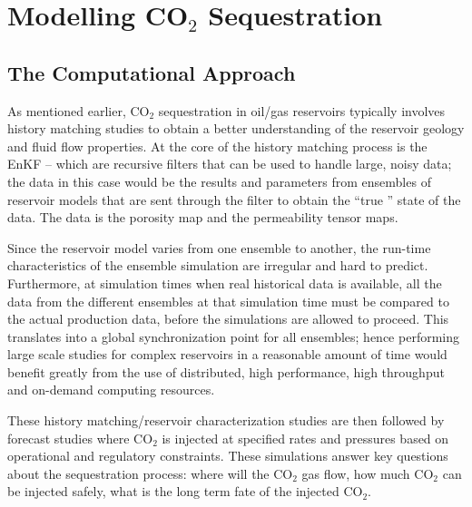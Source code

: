 \documentclass{rspublic}
\newcommand{\jhanote}[1]{ {\textcolor{red} { ***Jha: #1 }}}
\newcommand{\yyenote}[1]{ {\textcolor{blue} { ***yye00: #1 }}}
\newcommand{\jhanote}[1]{}
\newcommand{\yyenote}[1]{}
\begin{document}
\section{Modelling CO$_2$ Sequestration}



\subsection{The Computational Approach}

As mentioned earlier, CO$_2$ sequestration in oil/gas reservoirs
typically involves history matching studies to obtain a better
understanding of the reservoir geology and fluid flow properties.
At the core of the history matching process is the EnKF -- 
which are recursive filters that can be used to
handle large, noisy data; the data in this case would be the results
and parameters from ensembles of reservoir models that are sent
through the filter to obtain the ``true '' state of the data.
The data is the porosity map and the permeability tensor maps.

Since the reservoir model varies from one ensemble to another, the
run-time characteristics of the ensemble simulation are irregular and
hard to predict. Furthermore, at simulation times when real historical
data is available, all the data from the different ensembles at that
simulation time must be compared to the actual production data, before
the simulations are allowed to proceed. This translates into a global
synchronization point for all ensembles; hence performing large scale
studies for complex reservoirs in a reasonable amount of time would
benefit greatly from the use of distributed, high performance, high
throughput and on-demand computing resources.

These history matching/reservoir characterization studies are then
followed by forecast studies where CO$_2$ is injected at specified
rates and pressures based on operational and regulatory constraints.
These simulations answer key questions about the sequestration
process: where will the CO$_2$ gas flow, how much CO$_2$ can be
injected safely, what is the long term fate of the injected CO$_2$.
\end{document}
